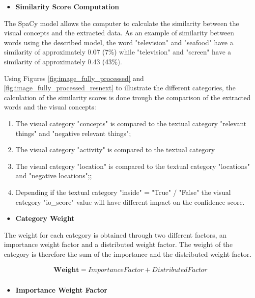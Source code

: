     

    \begin{itemize}
      \item \textbf{Similarity Score Computation}
    \end{itemize}

    The SpaCy model allows the computer to calculate the similarity between the visual concepts and the extracted data. As an example of similarity between words using the described model, the word "television" and "seafood" have a similarity of approximately 0.07 (7\%) while "television" and "screen" have a similarity of approximately 0.43 (43\%).
    
      
    Using Figures \ref{fig:image_fully_processed} and \ref{fig:image_fully_processed_resnext} to illustrate the different categories, the calculation of the similarity scores is done trough the comparison of the extracted words and the visual concepts:
    \begin{enumerate}
        \itemsep0em
        \item The visual category "concepts" is compared to the textual category "relevant things" and "negative relevant things";
        \item The visual category "activity" is compared to the textual category 
        \item The visual category "location" is compared to the textual category "locations" and "negative locations";;
        \item Depending if the textual category "inside" = "True" / "False" the visual category "io\_score" value will have different impact on the confidence score.
    \end{enumerate}

    \begin{itemize}
      \item \textbf{Category Weight}
    \end{itemize}


    The weight for each category is obtained through two different factors, an importance weight factor and a distributed weight factor. The weight of the category is therefore the sum of the importance and the distributed weight factor. 

    \begin{align*}
      &\textbf{Weight}  =   ImportanceFactor + DistributedFactor \\ 
  \end{align*}

    \newpage
    \begin{itemize}
      \item \textbf{Importance Weight Factor}
    \end{itemize}

